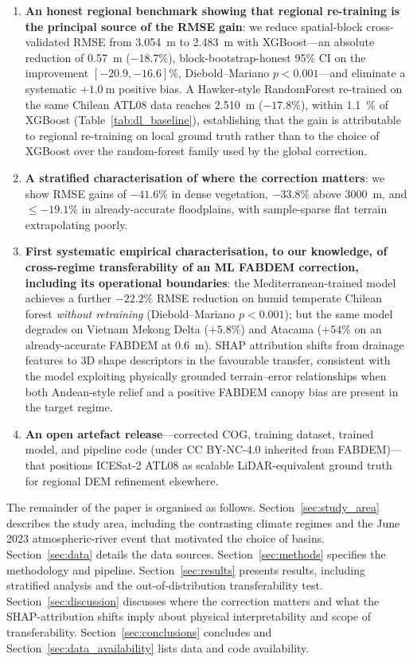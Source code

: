 \documentclass[preprint,authoryear,number]{elsarticle}
\begin{document}
\begin{enumerate}
\item \textbf{An honest regional benchmark showing that regional re-training is the principal source of the RMSE gain}: we reduce spatial-block cross-validated RMSE from \SI{3.054}{\meter} to \SI{2.483}{\meter} with XGBoost---an absolute reduction of \SI{0.57}{\meter} ($-18.7\%$), block-bootstrap-honest 95\% CI on the improvement $[-20.9, -16.6]\%$, Diebold--Mariano $p < 0.001$---and eliminate a systematic $+\SI{1.0}{\meter}$ positive bias. A Hawker-style RandomForest re-trained on the same Chilean ATL08 data reaches \SI{2.510}{\meter} ($-17.8\%$), within \SI{1.1}{\percent} of XGBoost (Table~\ref{tab:dl_baseline}), establishing that the gain is attributable to regional re-training on local ground truth rather than to the choice of XGBoost over the random-forest family used by the global \citet{Hawker2022FABDEM} correction.
\item \textbf{A stratified characterisation of where the correction matters}: we show RMSE gains of $-41.6\%$ in dense vegetation, $-33.8\%$ above \SI{3000}{\meter}, and $\leq -19.1\%$ in already-accurate floodplains, with sample-sparse flat terrain extrapolating poorly.
\item \textbf{First systematic empirical characterisation, to our knowledge, of cross-regime transferability of an ML FABDEM correction, including its operational boundaries}: the Mediterranean-trained model achieves a further $-22.2\%$ RMSE reduction on humid temperate Chilean forest \emph{without retraining} (Diebold--Mariano $p < 0.001$); but the same model degrades on Vietnam Mekong Delta ($+5.8\%$) and Atacama ($+54\%$ on an already-accurate FABDEM at \SI{0.6}{\meter}). SHAP attribution shifts from drainage features to 3D shape descriptors in the favourable transfer, consistent with the model exploiting physically grounded terrain--error relationships when both Andean-style relief and a positive FABDEM canopy bias are present in the target regime.
\item \textbf{An open artefact release}---corrected COG, training dataset, trained model, and pipeline code (under CC BY-NC-4.0 inherited from FABDEM)---that positions ICESat-2 ATL08 as scalable LiDAR-equivalent ground truth for regional DEM refinement elsewhere.
\end{enumerate}

The remainder of the paper is organised as follows. Section~\ref{sec:study_area} describes the study area, including the contrasting climate regimes and the June 2023 atmospheric-river event that motivated the choice of basins. Section~\ref{sec:data} details the data sources. Section~\ref{sec:methods} specifies the methodology and pipeline. Section~\ref{sec:results} presents results, including stratified analysis and the out-of-distribution transferability test. Section~\ref{sec:discussion} discusses where the correction matters and what the SHAP-attribution shifts imply about physical interpretability and scope of transferability. Section~\ref{sec:conclusions} concludes and Section~\ref{sec:data_availability} lists data and code availability.
\end{document}
